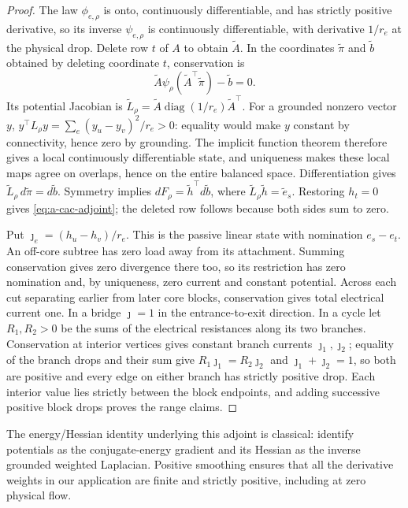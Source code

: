 \begin{proof}
The law $\phi_{e,\rho}$ is onto, continuously differentiable, and has
strictly positive derivative, so its inverse $\psi_{e,\rho}$ is
continuously differentiable, with derivative $1/r_e$ at the physical
drop. Delete row $t$ of $A$ to obtain $\widetilde A$. In the coordinates
$\widetilde\pi$ and $\widetilde b$ obtained by deleting coordinate $t$,
conservation is
\[
 \widetilde A\psi_\rho(\widetilde A^\top\widetilde\pi)
       -\widetilde b=0.
\]
Its potential Jacobian is
$\widetilde L_\rho=\widetilde A\operatorname{diag}(1/r_e)\widetilde A^\top$.
For a grounded nonzero vector $y$,
$y^\top L_\rho y=\sum_e(y_u-y_v)^2/r_e>0$: equality would make $y$ constant
by connectivity, hence zero by grounding. The implicit function theorem
therefore gives a local continuously differentiable state, and
uniqueness makes these local maps agree on overlaps, hence on the entire
balanced space.
Differentiation gives $\widetilde L_\rho\,d\widetilde\pi=d\widetilde b$.
Symmetry implies
$dF_\rho=\widetilde h^\top d\widetilde b$, where
$\widetilde L_\rho\widetilde h=\widetilde e_s$. Restoring $h_t=0$ gives
\cref{eq:a-cac-adjoint}; the deleted row follows because both sides
sum to zero.

Put $\jmath_e=(h_u-h_v)/r_e$. This is the passive linear state with nomination
$e_s-e_t$. An off-core subtree has zero load away from its attachment.
Summing conservation gives zero divergence there too, so its restriction
has zero nomination and, by uniqueness, zero current and constant
potential. Across each cut separating earlier from later core blocks,
conservation gives total electrical current one. In a bridge $\jmath =1$ in
the entrance-to-exit direction. In a cycle let $R_1,R_2>0$ be the sums
of the electrical resistances along its two branches. Conservation at
interior vertices gives constant branch currents $\jmath_1,\jmath_2$;
equality of the branch drops and their sum give
$R_1\jmath_1=R_2\jmath_2$ and $\jmath_1+\jmath_2=1$, so both are
positive and every edge on either branch has strictly positive drop. Each interior value lies
strictly between the block endpoints, and adding successive positive
block drops proves the range claims.
\end{proof}

The energy/Hessian identity underlying this adjoint is classical:
\citet[Section IV-A, Lemma 1(a)--(b), equations (19) and (21)]{misra2015-maximum-throughput-problem-in-dissipative}
identify potentials as the conjugate-energy gradient and its Hessian
as the inverse grounded weighted Laplacian. Positive smoothing ensures
that all the derivative weights in our application are finite and
strictly positive, including at zero physical flow.


